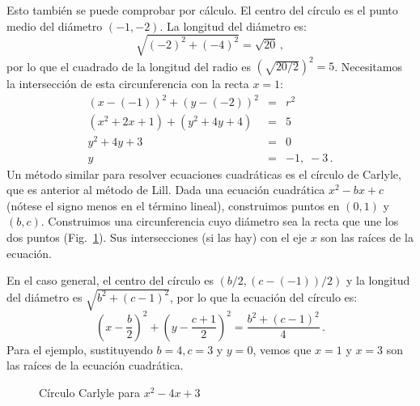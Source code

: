 Esto también se puede comprobar por cálculo. El centro del círculo es el punto medio del diámetro $(-1,-2)$. La longitud del diámetro es:
\[
\sqrt{(-2)^2+(-4)^2}=\sqrt{20}\,,
\]
por lo que el cuadrado de la longitud del radio es $\left(\sqrt{20/2}\right)^2=5$. Necesitamos la intersección de esta circunferencia con la recta $x=1$:
\begin{eqnarray*}
(x-(-1))^2+(y-(-2))^2&=&r^2\\
(x^2+2x+1)+(y^2+4y+4)&=&5\\
y^2+4y+3&=&0\\
y&=&-1,\;-3\,.
\end{eqnarray*}
Un método similar para resolver ecuaciones cuadráticas es el círculo de Carlyle, que es anterior al método de Lill. Dada una ecuación cuadrática $x^2-bx+c$ (nótese el signo menos en el término lineal), construimos puntos en $(0,1)$ y $(b,c)$. Construimos una circunferencia cuyo diámetro sea la recta que une los dos puntos (Fig.~\ref{f.carlyle-circle}). Sus intersecciones (si las hay) con el eje $x$ son las raíces de la ecuación.

En el caso general, el centro del círculo es $(b/2,(c-(-1))/2)$ y la longitud del diámetro es $\sqrt{b^2+(c-1)^2}$, por lo que la ecuación del círculo es:
\[
\left(x-\frac{b}{2}\right)^2+\left(y-\frac{c+1}{2}\right)^2=
\frac{b^2+(c-1)^2}{4}\,.
\]
Para el ejemplo, sustituyendo $b=4,c=3$ y $y=0$, vemos que $x=1$ y $x=3$ son las raíces de la ecuación cuadrática.

\begin{figure}[t]
\begin{center}
\end{center}
\caption{Círculo Carlyle para $x^2-4x+3$}\label{f.carlyle-circle}
\end{figure}


